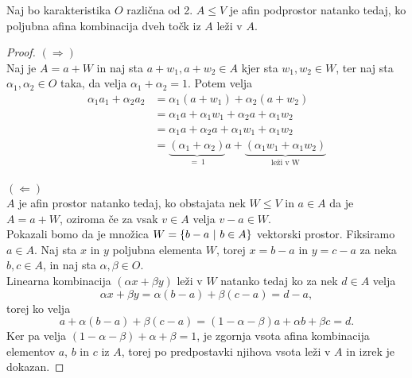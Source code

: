 \begin{trditev}
    Naj bo karakteristika $O$ različna od 2. $A \leq V$ je afin podprostor natanko tedaj, ko poljubna afina kombinacija dveh točk iz $A$ leži v $A$.
\end{trditev}

\begin{proof}
    $(\Rightarrow)$\\
    Naj je $A = a + W$ in naj sta $a + w_1, a + w_2 \in A$ kjer sta $w_1, w_2 \in W$, ter naj sta $\alpha_1, \alpha_2 \in O$ taka, da velja $\alpha_1 + \alpha_2 = 1$. Potem velja
    \begin{align*}
    \alpha_1 a_1 + \alpha_2 a_2 &= \alpha_1 (a + w_1) + \alpha_2 (a + w_2) \\
    &= \alpha_1 a + \alpha_1 w_1 + \alpha_2 a + \alpha_1 w_2 \\
    &= \alpha_1 a + \alpha_2 a + \alpha_1 w_1 + \alpha_1 w_2 \\
    &= \underbrace{(\alpha_1 + \alpha_2)}_{=\: 1} a + \underbrace{(\alpha_1 w_1 + \alpha_1 w_2)}_{\textrm{leži v W}}
    \end{align*}\\
    $(\Leftarrow)$\\ 
    $A$ je afin prostor natanko tedaj, ko obstajata nek $W \leq V$ in $a \in A$ da je $A = a + W$, oziroma če za vsak $v \in A$ velja $v - a \in W$. \\
    Pokazali bomo da je množica $W = \left\{b-a~\middle\vert~b \in A\right\}$ vektorski prostor.
    Fiksiramo $a \in A$. Naj sta $x$ in $y$ poljubna elementa $W$, torej $x = b - a$ in $y = c - a$ za neka $b, c \in A$, in naj sta $\alpha, \beta \in O$.\\
    Linearna kombinacija $ (\alpha x + \beta y)$ leži v $W $ natanko tedaj ko za nek $d \in A$ velja
    $$ \alpha x + \beta y = \alpha (b - a) + \beta (c - a) = d - a,$$
    torej ko velja
    $$ a + \alpha (b - a) + \beta (c - a) = (1 - \alpha - \beta) a + \alpha b + \beta c = d.$$
    Ker pa velja $(1 - \alpha - \beta) + \alpha + \beta = 1$, je zgornja vsota afina kombinacija elementov $a$, $b$ in $c$ iz $A$, torej po predpostavki njihova vsota leži v $A$ in izrek je dokazan.
\end{proof}